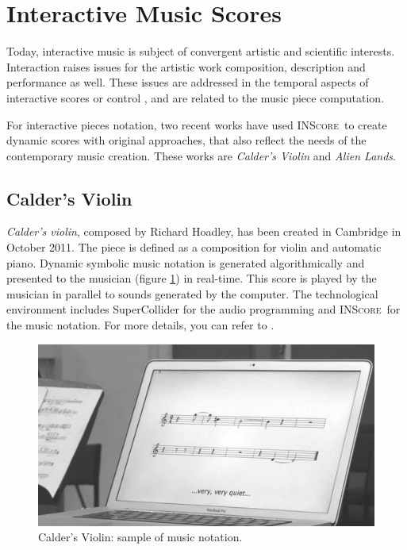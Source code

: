 \documentclass{article}
\newcommand{\inscore}		{\textsc{\small INScore}}
\begin{document}
\section{Interactive Music Scores}\label{interactscore}

Today, interactive music is subject of convergent artistic and scientific interests. Interaction raises issues for the artistic work composition, description and performance as well.
These issues are addressed in the temporal aspects of interactive scores \cite{allombert09} 
or control \cite{acont08}, and are related to the music piece computation.

For interactive pieces notation, two recent works have used \inscore\ to create dynamic scores with original approaches, that also reflect the needs of the contemporary music creation. These works are \emph{Calder's Violin} and \emph{Alien Lands}.

\subsection{Calder's Violin}
\textit{Calder's violin}, composed by Richard Hoadley, has been created in Cambridge in October 2011. The piece is defined as a composition for violin and automatic piano. Dynamic symbolic music notation is generated algorithmically and presented to the musician (figure \ref{fig:cv}) in real-time. This score is played by the musician in parallel to sounds generated by the computer. 
The technological environment includes SuperCollider for the audio programming and \inscore\ for the music notation. For more details, you can refer to \cite{Hoadley12}. 

\begin{figure}[htbp]
\centerline{
	\includegraphics[width=0.9\columnwidth]{imgs/caldersv}}
\caption{Calder's Violin: sample of music notation.}
\label{fig:cv}
\end{figure}
\end{document}
